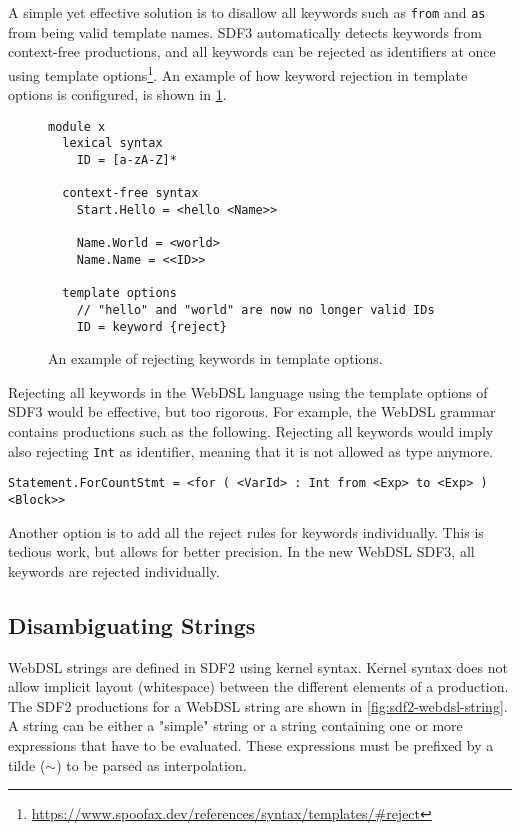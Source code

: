       A simple yet effective solution is to disallow all keywords such as \texttt{from} and \texttt{as} from being valid template names. SDF3 automatically detects keywords from context-free productions, and all keywords can be rejected as identifiers at once using template options\footnote{\url{https://www.spoofax.dev/references/syntax/templates/\#reject}}. An example of how keyword rejection in template options is configured, is shown in \cref{fig:sdf3-template-options-reject}.

      \begin{figure}
        \begin{verbatim}
module x
  lexical syntax
    ID = [a-zA-Z]*

  context-free syntax
    Start.Hello = <hello <Name>>

    Name.World = <world>
    Name.Name = <<ID>>

  template options
    // "hello" and "world" are now no longer valid IDs
    ID = keyword {reject}
        \end{verbatim}
        \caption{\label{fig:sdf3-template-options-reject}An example of rejecting keywords in template options.}
      \end{figure}

      Rejecting all keywords in the WebDSL language using the template options of SDF3 would be effective, but too rigorous. For example, the WebDSL grammar contains productions such as the following. Rejecting all keywords would imply also rejecting \texttt{Int} as identifier, meaning that it is not allowed as type anymore.
      
      \texttt{Statement.ForCountStmt = <for ( <VarId> : Int from <Exp> to <Exp> ) <Block>>}

      Another option is to add all the reject rules for keywords individually. This is tedious work, but allows for better precision. In the new WebDSL SDF3, all keywords are rejected individually.

    \subsection{Disambiguating Strings}

      WebDSL strings are defined in SDF2 using kernel syntax. Kernel syntax does not allow implicit layout (whitespace) between the different elements of a production. The SDF2 productions for a WebDSL string are shown in \cref{fig:sdf2-webdsl-string}. A string can be either a "simple" string or a string containing one or more expressions that have to be evaluated. These expressions must be prefixed by a tilde (\texttt{$\sim$}) to be parsed as interpolation.

